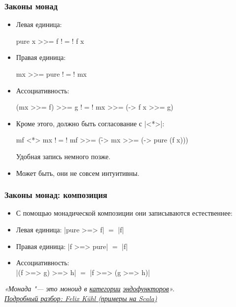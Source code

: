 \documentclass[11pt]{beamer}
\begin{document}
\begin{frame}[fragile]
  \frametitle{Законы монад}
  \begin{itemize}
    \item Левая единица:
          \begin{haskell}
            pure x >>= f !$=$! f x
          \end{haskell}
    \item Правая единица:
          \begin{haskell}
            mx >>= pure !$=$! mx
          \end{haskell}
    \item Ассоциативность:
          \begin{haskellsmall}
            (mx >>= f) >>= g !$=$! mx >>= (\x -> f x >>= g)
          \end{haskellsmall}
    \item Кроме этого, должно быть согласование с \haskinline|<*>|:
          \begin{haskellsmall}
            mf <*> mx !$=$!
              mf >>= (\f -> mx >>= (\x -> pure (f x)))
          \end{haskellsmall}
          Удобная запись немного позже.
    \item Может быть, они не совсем интуитивны.
  \end{itemize}
\end{frame}

\begin{frame}[fragile]
  \frametitle{Законы монад: композиция}
  \begin{itemize}
    \item С помощью монадической композиции они записываются естественнее:
    \item Левая единица: \pause \haskinline|pure >=> f| $=$ \haskinline|f|
    \item Правая единица: \pause \haskinline|f >=> pure| $=$ \haskinline|f|
    \item Ассоциативность: \pause \\
          \haskinline|(f >=> g) >=> h| $=$ \haskinline|f >=> (g >=> h)|
  \end{itemize}
  \pause
  \vfill
  \begin{center}
    \small\itshape
    «Монада "--- это моноид в \href{https://en.wikipedia.org/wiki/Category_(mathematics)}{категории} \href{https://en.wikipedia.org/wiki/Endofunctor}{эндофункторов}».
    \\
    \normalfont\footnotesize
    \href{https://medium.com/@felix.kuehl/a-monad-is-just-a-monoid-in-the-category-of-endofunctors-lets-actually-unravel-this-f5d4b7dbe5d6}{Подробный разбор: Felix Kühl (примеры на Scala)}
  \end{center}
\end{frame}
\end{document}
